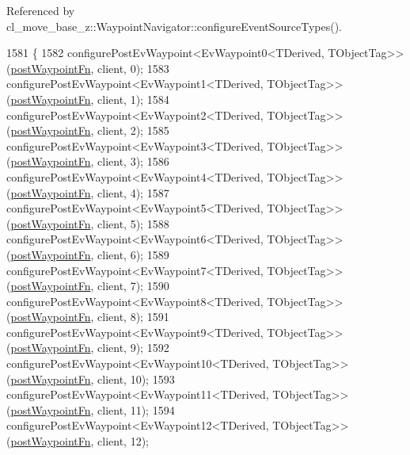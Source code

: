 Referenced by cl\+\_\+move\+\_\+base\+\_\+z\+::\+Waypoint\+Navigator\+::configure\+Event\+Source\+Types().


\begin{DoxyCode}
1581 \{
1582     configurePostEvWaypoint<EvWaypoint0<TDerived, TObjectTag>>(\hyperlink{classcl__move__base__z_1_1WaypointEventDispatcher_a964a57fcce5d48ec60243230722d8dd7}{postWaypointFn}, client, 0);
1583     configurePostEvWaypoint<EvWaypoint1<TDerived, TObjectTag>>(\hyperlink{classcl__move__base__z_1_1WaypointEventDispatcher_a964a57fcce5d48ec60243230722d8dd7}{postWaypointFn}, client, 1);
1584     configurePostEvWaypoint<EvWaypoint2<TDerived, TObjectTag>>(\hyperlink{classcl__move__base__z_1_1WaypointEventDispatcher_a964a57fcce5d48ec60243230722d8dd7}{postWaypointFn}, client, 2);
1585     configurePostEvWaypoint<EvWaypoint3<TDerived, TObjectTag>>(\hyperlink{classcl__move__base__z_1_1WaypointEventDispatcher_a964a57fcce5d48ec60243230722d8dd7}{postWaypointFn}, client, 3);
1586     configurePostEvWaypoint<EvWaypoint4<TDerived, TObjectTag>>(\hyperlink{classcl__move__base__z_1_1WaypointEventDispatcher_a964a57fcce5d48ec60243230722d8dd7}{postWaypointFn}, client, 4);
1587     configurePostEvWaypoint<EvWaypoint5<TDerived, TObjectTag>>(\hyperlink{classcl__move__base__z_1_1WaypointEventDispatcher_a964a57fcce5d48ec60243230722d8dd7}{postWaypointFn}, client, 5);
1588     configurePostEvWaypoint<EvWaypoint6<TDerived, TObjectTag>>(\hyperlink{classcl__move__base__z_1_1WaypointEventDispatcher_a964a57fcce5d48ec60243230722d8dd7}{postWaypointFn}, client, 6);
1589     configurePostEvWaypoint<EvWaypoint7<TDerived, TObjectTag>>(\hyperlink{classcl__move__base__z_1_1WaypointEventDispatcher_a964a57fcce5d48ec60243230722d8dd7}{postWaypointFn}, client, 7);
1590     configurePostEvWaypoint<EvWaypoint8<TDerived, TObjectTag>>(\hyperlink{classcl__move__base__z_1_1WaypointEventDispatcher_a964a57fcce5d48ec60243230722d8dd7}{postWaypointFn}, client, 8);
1591     configurePostEvWaypoint<EvWaypoint9<TDerived, TObjectTag>>(\hyperlink{classcl__move__base__z_1_1WaypointEventDispatcher_a964a57fcce5d48ec60243230722d8dd7}{postWaypointFn}, client, 9);
1592     configurePostEvWaypoint<EvWaypoint10<TDerived, TObjectTag>>(\hyperlink{classcl__move__base__z_1_1WaypointEventDispatcher_a964a57fcce5d48ec60243230722d8dd7}{postWaypointFn}, client, 10);
1593     configurePostEvWaypoint<EvWaypoint11<TDerived, TObjectTag>>(\hyperlink{classcl__move__base__z_1_1WaypointEventDispatcher_a964a57fcce5d48ec60243230722d8dd7}{postWaypointFn}, client, 11);
1594     configurePostEvWaypoint<EvWaypoint12<TDerived, TObjectTag>>(\hyperlink{classcl__move__base__z_1_1WaypointEventDispatcher_a964a57fcce5d48ec60243230722d8dd7}{postWaypointFn}, client, 12);

\end{DoxyCode}
